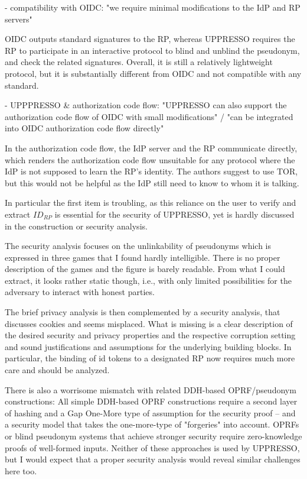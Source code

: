 \documentclass[letterpaper,onecolumn,10pt]{article}
\begin{document}
- compatibility with OIDC: "we require minimal modifications to the IdP and RP servers"

OIDC outputs standard signatures to the RP, whereas UPPRESSO requires the RP to participate in an interactive protocol to blind and unblind the pseudonym, and check the related signatures. Overall, it is still a relatively lightweight protocol, but it is substantially different from OIDC and not compatible with any standard.

- UPPPRESSO \& authorization code flow: "UPPRESSO can also support the authorization code flow of
OIDC with small modifications" / "can be integrated into OIDC authorization code flow directly"

In the authorization code flow, the IdP server and the RP communicate directly, which renders the authorization code flow unsuitable for any protocol where the IdP is not supposed to learn the RP's identity. The authors suggest to use TOR, but this would not be helpful as the IdP still need to know to whom it is talking.


In particular the first item is troubling, as this reliance on the user to verify and extract $ID_{RP}$ is essential for the security of UPPRESSO, yet is hardly discussed in the construction or security analysis.

The security analysis focuses on the unlinkability of pseudonyms which is expressed in three games that I found hardly intelligible. There is no proper description of the games and the figure is barely readable. From what I could extract, it looks rather static though, i.e., with only limited possibilities for the adversary to interact with honest parties.

The brief privacy analysis is then complemented by a security analysis, that discusses cookies and seems misplaced.
What is missing is a clear description of the desired security and privacy properties and the respective corruption setting and sound justifications and assumptions for the underlying building blocks. In particular, the binding of id tokens to a designated RP now requires much more care and should be analyzed.

There is also a worrisome mismatch with related DDH-based OPRF/pseudonym constructions: All simple DDH-based OPRF constructions require a second layer of hashing and a Gap One-More type of assumption for the security proof -- and a security model that takes the one-more-type of "forgeries" into account. OPRFs or blind pseudonym systems that achieve stronger security require zero-knowledge proofs of well-formed inputs. Neither of these approaches is used by UPPRESSO, but I would expect that a proper security analysis would reveal similar challenges here too.
\end{document}
